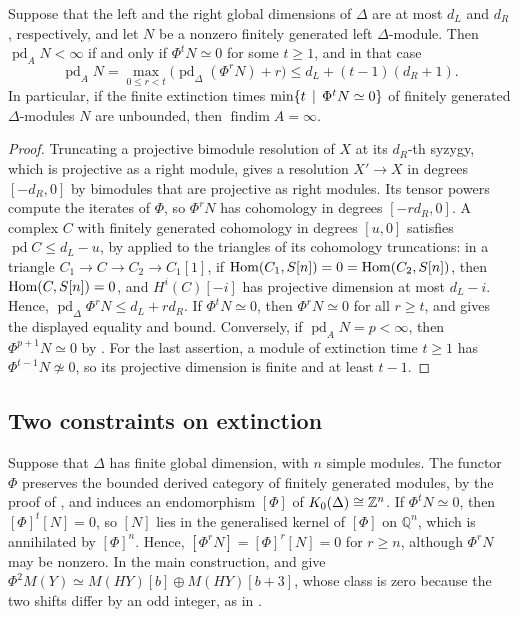 \begin{corollary}
  \label{coro:extinction}
  Suppose that the left and the right global dimensions of $\Delta$ are at most
  $d_L$ and $d_R$, respectively, and let $N$ be a nonzero finitely generated
  left $\Delta$-module. Then ${\operatorname{pd}_AN<\infty}$ if and only if
  ${\Phi^tN\simeq0}$ for some ${t\geq1}$, and in that case
  \[
    \operatorname{pd}_AN=\max_{0\leq r<t}\bigl(\operatorname{pd}_\Delta
    (\Phi^rN)+r\bigr)\leq d_L+(t-1)(d_R+1).
  \]
  In particular, if the finite extinction times ${\min\set{t}[\Phi^tN\simeq0]}$
  of finitely generated $\Delta$-modules $N$ are unbounded, then
  ${\operatorname{findim}A=\infty}$.
\end{corollary}

\begin{proof}
  Truncating a projective bimodule resolution of $X$ at its $d_R$-th syzygy,
  which is projective as a right module, gives a resolution ${X'\to X}$ in
  degrees ${[-d_R,0]}$ by bimodules that are projective as right modules. Its
  tensor powers compute the iterates of $\Phi$, so $\Phi^rN$ has cohomology in
  degrees ${[-rd_R,0]}$. A complex $C$ with finitely generated cohomology in
  degrees $[u,0]$ satisfies ${\operatorname{pd}C\leq d_L-u}$, by
   applied to the triangles of its cohomology
  truncations: in a triangle ${C_1\to C\to C_2\to C_1[1]}$, if
  ${\Hom{C_1}{S[n]}=0=\Hom{C_2}{S[n]}}$, then ${\Hom{C}{S[n]}=0}$, and
  ${H^i(C)[-i]}$ has projective dimension at most ${d_L-i}$. Hence,
  ${\operatorname{pd}_\Delta\Phi^rN\leq d_L+rd_R}$. If ${\Phi^tN\simeq0}$, then
  ${\Phi^rN\simeq0}$ for all ${r\geq t}$, and  gives the
  displayed equality and bound. Conversely, if ${\operatorname{pd}_AN=p<\infty}$,
  then ${\Phi^{p+1}N\simeq0}$ by . For the last assertion,
  a module of extinction time ${t\geq1}$ has ${\Phi^{t-1}N\not\simeq0}$, so its
  projective dimension is finite and at least ${t-1}$.
\end{proof}

\subsection{Two constraints on extinction}
\label{subsec:extinction-constraints}

\begin{remark}
  \label{rem:k0-invisibility}
  Suppose that $\Delta$ has finite global dimension, with $n$ simple modules.
  The functor $\Phi$ preserves the bounded derived category of finitely
  generated modules, by the proof of , and induces an
  endomorphism $[\Phi]$ of ${K_0(\Delta)\cong\mathbb{Z}^n}$. If ${\Phi^tN\simeq0}$, then
  ${[\Phi]^t[N]=0}$, so $[N]$ lies in the generalised kernel of $[\Phi]$ on
  $\mathbb{Q}^n$, which is annihilated by $[\Phi]^n$. Hence,
  ${[\Phi^rN]=[\Phi]^r[N]=0}$ for ${r\geq n}$, although $\Phi^rN$ may be nonzero. In
  the main construction,
   and  give
  ${\Phi^2M(Y)\simeq M(HY)[b]\oplus M(HY)[b+3]}$, whose class is zero because
  the two shifts differ by an odd integer, as in .
\end{remark}

